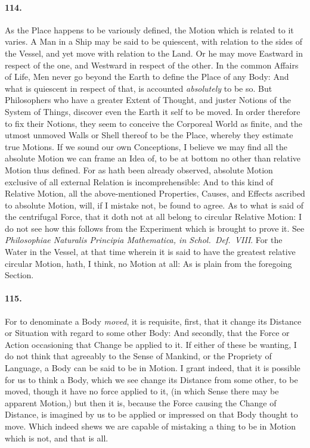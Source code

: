 \documentclass[]{article}
\newenvironment{sectionbody}{}{}
\begin{document}
\begin{sectionbody}
\paragraph{114.} As the Place happens to be variously defined, the Motion which is
related to it varies.  A Man in a Ship may be said to be
quiescent, with relation to the sides of the Vessel, and yet move
with relation to the Land.  Or he may move Eastward in respect of
the one, and Westward in respect of the other.  In the common
Affairs of Life, Men never go beyond the Earth to define the
Place of any Body: And what is quiescent in respect of that, is
accounted \emph{absolutely} to be so.  But Philosophers who
have a greater Extent of Thought, and juster Notions of the
System of Things, discover even the Earth it self to be moved.
In order therefore to fix their Notions, they seem to conceive
the Corporeal World as finite, and the utmost unmoved Walls or
Shell thereof to be the Place, whereby they estimate true
Motions.  If we sound our own Conceptions, I believe we may find
all the absolute Motion we can frame an Idea of, to be at bottom
no other than relative Motion thus defined.  For as hath been
already observed, absolute Motion exclusive of all external
Relation is incomprehensible: And to this kind of Relative
Motion, all the above-mentioned Properties, Causes, and Effects
ascribed to absolute Motion, will, if I mistake not, be found to
agree.  As to what is said of the centrifugal Force, that it doth
not at all belong to circular Relative Motion: I do not see how
this follows from the Experiment which is brought to prove it.
See \emph{Philosophiae Naturalis Principia Mathematica, in
Schol.\ Def.~VIII}.  For the Water in the Vessel, at that time
wherein it is said to have the greatest relative circular Motion,
hath, I think, no Motion at all: As is plain from the foregoing
Section.



\paragraph{115.} For to denominate a Body \emph{moved}, it is requisite, first,
that it change its Distance or Situation with regard to some
other Body: And secondly, that the Force or Action occasioning
that Change be applied to it.  If either of these be wanting, I
do not think that agreeably to the Sense of Mankind, or the
Propriety of Language, a Body can be said to be in Motion.  I
grant indeed, that it is possible for us to think a Body, which
we see change its Distance from some other, to be moved, though
it have no force applied to it, (in which Sense there may be
apparent Motion,) but then it is, because the Force causing the
Change of Distance, is imagined by us to be applied or impressed
on that Body thought to move.  Which indeed shews we are capable
of mistaking a thing to be in Motion which is not, and that is
all.




\end{sectionbody}
\end{document}
